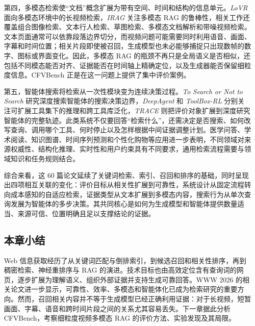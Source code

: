 第四，多模态检索使“文档”概念扩展为带有空间、时间和结构的信息单元。\emph{LoVR} 面向多模态环境中的长视频检索，\emph{IRAG} 关注多模态 RAG 的鲁棒性，相关工作还覆盖组合图像检索、文本行人检索、草图检索、多模态文档解析和带噪视频检索。文本页面通常可以依靠段落边界切分，而视频问题可能需要同时利用语音、画面、字幕和时间位置；相关片段即使被召回，生成模型也未必能够捕捉只出现数帧的数字、图标或界面变化。因此，多模态 RAG 的瓶颈不再只是全局语义是否相似，还包括不同模态能否对齐、证据能否在时间轴上精确定位，以及生成器能否保留细粒度信息。CFVBench 正是在这一问题上提供了集中评价案例。

第五，智能体搜索将检索从一次性模块变为连续决策过程。\emph{To Search or Not to Search} 研究深度搜索智能体的搜索决策边界，\emph{DeepAgent} 和 \emph{ToolBox-RL} 分别关注可扩展工具集下的推理和跨工具库泛化，\emph{TRACE} 则把评价对象扩展到深度研究智能体的完整轨迹。此类系统不仅要回答“检索什么”，还需决定是否搜索、如何改写查询、调用哪个工具、何时停止以及怎样根据中间证据调整计划。医学问答、学术阅读、知识图谱、时间序列预测和个性化购物等应用进一步表明，不同领域对来源权威性、结构化推理、实时性和用户约束具有不同要求，通用检索流程需要与领域知识和任务规则结合。

综合来看，这 60 篇论文延续了关键词检索、索引、召回和排序的基础，同时呈现出四项相互关联的变化：评价目标从相关性扩展到可靠性，系统设计从固定流程转向成本感知的自适应检索，证据类型从文本扩展到多模态内容，搜索行为从单次查询发展为智能体的多步决策。其共同核心是如何为生成模型和智能体提供数量适当、来源可信、位置明确且足以支撑结论的证据。

\subsection{本章小结}

Web 信息获取经历了从关键词匹配与倒排索引，到候选召回和相关性排序，再到稠密检索、神经重排序与 RAG 的演进。技术目标也由高效定位含有查询词的网页，逐步扩展为理解语义、组织外部证据并支持生成可靠回答。WWW 2026 的相关论文进一步显示，可靠性、效率、多模态和智能体化已成为检索研究的重要方向。然而，召回相关内容并不等于生成模型已经正确利用证据：对于长视频，短暂画面、字幕、语音和跨时间片段之间的关系尤其容易丢失。下一章据此分析 CFVBench，考察细粒度视频多模态 RAG 的评价方法、实验发现及其局限。
